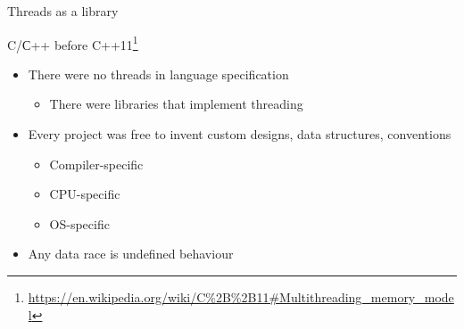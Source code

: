 \begin{frame}[t]{Threads as a library}

C/С++ before C++11\footnote{\tiny\url{https://en.wikipedia.org/wiki/C\%2B\%2B11#Multithreading_memory_model}}

\pause
\begin{itemize}
  \item There were no threads in language specification
  \begin{itemize}
    \item There were libraries that implement threading
  \end{itemize}  
  \item Every project was free to invent custom designs, data structures, conventions
  \begin{itemize}
    \item Compiler-specific
    \item CPU-specific
    \item OS-specific
  \end{itemize}    
  \item Any data race is undefined behaviour
\end{itemize}

\end{frame}


